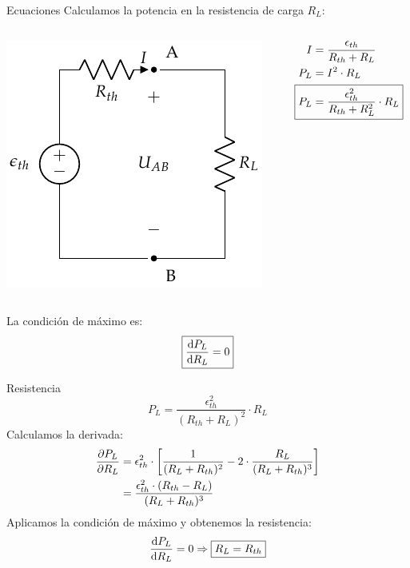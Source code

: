 \documentclass[aspectratio=169, usenames,svgnames,dvipsnames]{beamer}
\begin{document}
\begin{frame}[label={sec:org2c82e8c}]{Ecuaciones}
Calculamos la potencia en la resistencia de carga \(R_L\):
\begin{columns}
\begin{column}{0.45\columnwidth}
\begin{center}
\includegraphics[height=0.45\textheight]{../figs/EquivalenteThevenin0_R.pdf}
\end{center}
\end{column}

\begin{column}{0.45\columnwidth}
\begin{align*}
I &= \frac{\epsilon_{th}}{R_{th} + R_L}\\
P_L &= I^2 \cdot R_L\\
\Aboxed{P_L &= \frac{\epsilon^2_{th}}{R_{th} + R_L^2} \cdot R_L}
\end{align*}
\end{column}
\end{columns}

La condición de máximo es:
\[
  \boxed{%
    \diff{P_L}{R_L} = 0%
  }
\]
\end{frame}

\begin{frame}[label={sec:org4758896}]{Resistencia}
\[
  P_L = \frac{\epsilon^2_{th}}{(R_{th} + R_L)^2} \cdot R_L
\]
Calculamos la derivada:
\begin{align*}
  \diffp{P_L}{R_L} &= \epsilon^2_{th} \cdot \left[\frac{1}{(R_L + R_{th})^2} - 2 \cdot \frac{R_L}{(R_L + R_{th})^3}\right]\\
		   &= \frac{\epsilon^2_{th} \cdot (R_{th} - R_L)}{(R_L + R_{th})^3}
\end{align*}
Aplicamos la condición de máximo y obtenemos la resistencia:
\[
   \diff{P_L}{R_L} = 0 \Rightarrow \boxed{R_L = R_{th}}
\]
\end{frame}
\end{document}
